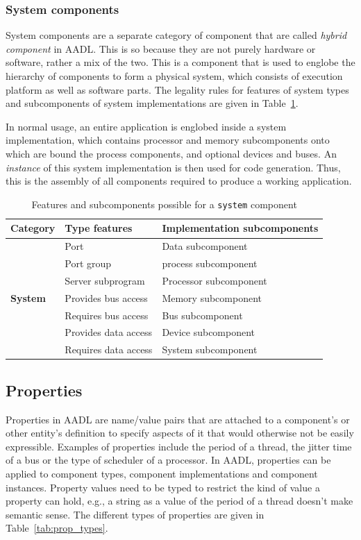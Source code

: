 \subsubsection{System components}
System components are a separate category of component that are called
\emph{hybrid component} in AADL. This is so because they are not
purely hardware or software, rather a mix of the two. This is a
component that is used to englobe the hierarchy of components to form
a physical system, which consists of execution platform as well as
software parts. The legality rules for features of system types and
subcomponents of system implementations are given in
Table~\ref{tab:sys_rules}.

In normal usage, an entire application is englobed inside a system
implementation, which contains processor and memory subcomponents onto
which are bound the process components, and optional devices and
buses. An \emph{instance} of this system implementation is then used
for code generation. Thus, this is the assembly of all components
required to produce a working application.

\begin{table}
\centering
\begin{tabular}{|l|l|l|}
\hline
\textbf{Category} & \textbf{Type features} & \textbf{Implementation
  subcomponents} \\
\hline
 & Port & Data subcomponent \\
 & Port group & process subcomponent \\
 & Server subprogram & Processor subcomponent \\
\textbf{System} & Provides bus access & Memory subcomponent \\
 & Requires bus access & Bus subcomponent \\
 & Provides data access & Device subcomponent \\
 & Requires data access & System subcomponent \\
\hline
\end{tabular}
\caption{Features and subcomponents possible for a \texttt{system}
  component}
\label{tab:sys_rules}
\end{table}

\subsection{Properties}
Properties in AADL are name/value pairs that are attached to a
component's or other entity's definition to specify aspects of it that
would otherwise not be easily expressible. Examples of properties
include the period of a thread, the jitter time of a bus or the type
of scheduler of a processor. In AADL, properties can be applied to
component types, component implementations and component instances.
Property values need to be typed to restrict the kind of value a
property can hold, e.g., a string as a value of the period of a thread
doesn't make semantic sense. The different types of properties are
given in Table~\ref{tab:prop_types}.

